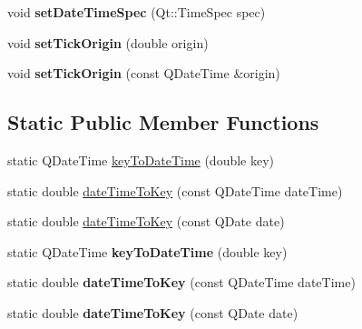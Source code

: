 \begin{DoxyCompactItemize}
\item 
void {\bfseries set\+Date\+Time\+Spec} (Qt\+::\+Time\+Spec spec)\hypertarget{class_q_c_p_axis_ticker_date_time_afbd987c7197e42ab61e67fb1c38abebc}{}\label{class_q_c_p_axis_ticker_date_time_afbd987c7197e42ab61e67fb1c38abebc}

\item 
void {\bfseries set\+Tick\+Origin} (double origin)\hypertarget{class_q_c_p_axis_ticker_date_time_a5388e048cbd32cf1ba730b9f1859eb5c}{}\label{class_q_c_p_axis_ticker_date_time_a5388e048cbd32cf1ba730b9f1859eb5c}

\item 
void {\bfseries set\+Tick\+Origin} (const Q\+Date\+Time \&origin)\hypertarget{class_q_c_p_axis_ticker_date_time_a2ea905872b8171847a49a5e093fb0c48}{}\label{class_q_c_p_axis_ticker_date_time_a2ea905872b8171847a49a5e093fb0c48}

\end{DoxyCompactItemize}
\subsection*{Static Public Member Functions}
\begin{DoxyCompactItemize}
\item 
static Q\+Date\+Time \hyperlink{class_q_c_p_axis_ticker_date_time_a4c1761ad057f5564804a53f942629b53}{key\+To\+Date\+Time} (double key)
\item 
static double \hyperlink{class_q_c_p_axis_ticker_date_time_aa24f293f16fff0f937bf71f4140033f1}{date\+Time\+To\+Key} (const Q\+Date\+Time date\+Time)
\item 
static double \hyperlink{class_q_c_p_axis_ticker_date_time_ad87afc7dba65843f68da5ca88bc004f4}{date\+Time\+To\+Key} (const Q\+Date date)
\item 
static Q\+Date\+Time {\bfseries key\+To\+Date\+Time} (double key)\hypertarget{class_q_c_p_axis_ticker_date_time_a611fe16e483e6dc953252b16c06c6822}{}\label{class_q_c_p_axis_ticker_date_time_a611fe16e483e6dc953252b16c06c6822}

\item 
static double {\bfseries date\+Time\+To\+Key} (const Q\+Date\+Time date\+Time)\hypertarget{class_q_c_p_axis_ticker_date_time_a4f8c046473805fd1d973e0f1817f84e5}{}\label{class_q_c_p_axis_ticker_date_time_a4f8c046473805fd1d973e0f1817f84e5}

\item 
static double {\bfseries date\+Time\+To\+Key} (const Q\+Date date)\hypertarget{class_q_c_p_axis_ticker_date_time_a1d8101ae5dd72f1b6d2bb25ad4678e0b}{}\label{class_q_c_p_axis_ticker_date_time_a1d8101ae5dd72f1b6d2bb25ad4678e0b}

\end{DoxyCompactItemize}

